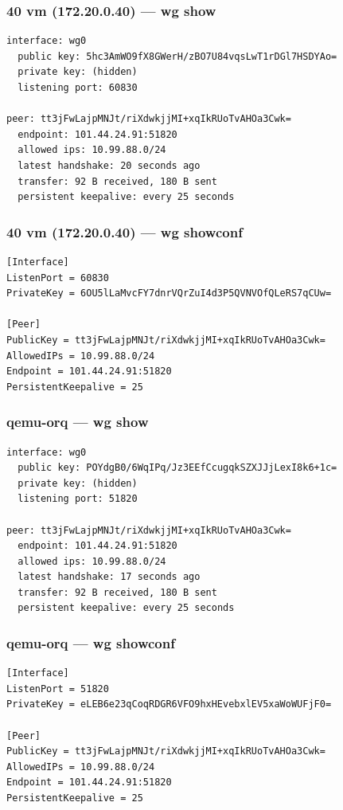 \documentclass[11pt,a4paper]{article}
\begin{document}
\subsubsection*{40 vm (172.20.0.40) — wg show}
\begin{lstlisting}
interface: wg0
  public key: 5hc3AmWO9fX8GWerH/zBO7U84vqsLwT1rDGl7HSDYAo=
  private key: (hidden)
  listening port: 60830

peer: tt3jFwLajpMNJt/riXdwkjjMI+xqIkRUoTvAHOa3Cwk=
  endpoint: 101.44.24.91:51820
  allowed ips: 10.99.88.0/24
  latest handshake: 20 seconds ago
  transfer: 92 B received, 180 B sent
  persistent keepalive: every 25 seconds

\end{lstlisting}

\subsubsection*{40 vm (172.20.0.40) — wg showconf}
\begin{lstlisting}
[Interface]
ListenPort = 60830
PrivateKey = 6OU5lLaMvcFY7dnrVQrZuI4d3P5QVNVOfQLeRS7qCUw=

[Peer]
PublicKey = tt3jFwLajpMNJt/riXdwkjjMI+xqIkRUoTvAHOa3Cwk=
AllowedIPs = 10.99.88.0/24
Endpoint = 101.44.24.91:51820
PersistentKeepalive = 25

\end{lstlisting}

\subsubsection*{qemu-orq — wg show}
\begin{lstlisting}
interface: wg0
  public key: POYdgB0/6WqIPq/Jz3EEfCcugqkSZXJJjLexI8k6+1c=
  private key: (hidden)
  listening port: 51820

peer: tt3jFwLajpMNJt/riXdwkjjMI+xqIkRUoTvAHOa3Cwk=
  endpoint: 101.44.24.91:51820
  allowed ips: 10.99.88.0/24
  latest handshake: 17 seconds ago
  transfer: 92 B received, 180 B sent
  persistent keepalive: every 25 seconds

\end{lstlisting}

\subsubsection*{qemu-orq — wg showconf}
\begin{lstlisting}
[Interface]
ListenPort = 51820
PrivateKey = eLEB6e23qCoqRDGR6VFO9hxHEvebxlEV5xaWoWUFjF0=

[Peer]
PublicKey = tt3jFwLajpMNJt/riXdwkjjMI+xqIkRUoTvAHOa3Cwk=
AllowedIPs = 10.99.88.0/24
Endpoint = 101.44.24.91:51820
PersistentKeepalive = 25

\end{lstlisting}
\end{document}
